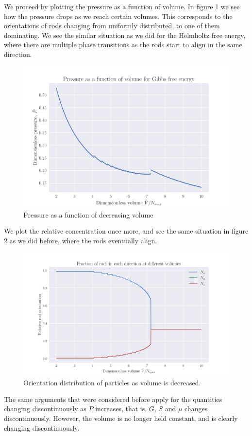 \documentclass[reprint,english,notitlepage,aps,nobalancelastpage,nofootinbib]{revtex4-1}
\begin{document}
We proceed by plotting the pressure as a function of volume. In figure \ref{fig:G_PV} we see how the pressure drops as we reach certain volumes. This corresponds to the orientations of rods changing from uniformly distributed, to one of them dominating. We see the similar situation as we did for the Helmholtz free energy, where there are multiple phase transitions as the rods start to align in the same direction.  
\begin{figure}[h!]
	\centering
	\includegraphics[width=0.8\linewidth]{gibbs_PV.pdf}
	\caption{Pressure as a function of decreasing volume}
	\label{fig:G_PV}
\end{figure}

We plot the relative concentration once more, and see the same situation in figure \ref{fig:G_N} as we did before, where the rods eventually align.  
\begin{figure}[h!]
	\centering
	\includegraphics[width=0.8\linewidth]{gibbs_number_density.pdf}
	\caption{Orientation distribution of particles as volume is decreased.}
	\label{fig:G_N}
\end{figure}

The same arguments that were considered before apply for the quantities changing discontinuously as $P$ increases, that is, $G$, $S$ and $\mu$ changes discontinuously. However, the volume is no longer held constant, and is clearly changing discontinuously. 
\end{document}

